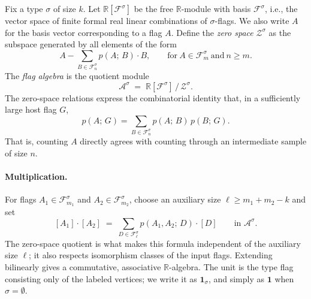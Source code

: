 \documentclass{article}
\newcommand{\den}[2]{p(#1;\,#2)}
\begin{document}
Fix a type $\sigma$ of size $k$.  Let
$\mathbb{R}[\mathcal{F}^\sigma]$ be the free $\mathbb{R}$-module with basis
$\mathcal{F}^\sigma$, i.e., the vector space of finite formal real linear
combinations of $\sigma$-flags.  We also write $A$ for the basis vector
corresponding to a flag $A$.
Define the \emph{zero space} $\mathcal{Z}^\sigma$ as the subspace generated
by all elements of the form
\[
  A - \sum_{B \in \mathcal{F}^\sigma_n} \den{A}{B} \cdot B,
  \qquad \text{for}\ A \in \mathcal{F}^\sigma_m \ \text{and}\ n \geq m.
\]
The \emph{flag algebra} is the quotient module
\[
  \mathcal{A}^\sigma \;=\; \mathbb{R}[\mathcal{F}^\sigma] \,/\, \mathcal{Z}^\sigma.
\]
The zero-space relations express the combinatorial identity that, in a
sufficiently large host flag $G$,
\[
  \den{A}{G}
  =
  \sum_{B \in \mathcal{F}^\sigma_n} \den{A}{B}\,\den{B}{G}.
\]
That is, counting $A$ directly agrees with counting through an intermediate
sample of size $n$.

\paragraph{Multiplication.}
For flags $A_1 \in \mathcal{F}^\sigma_{m_1}$ and
$A_2 \in \mathcal{F}^\sigma_{m_2}$, choose an auxiliary size
$\ell \geq m_1 + m_2 - k$ and set
\[
  [A_1] \cdot [A_2]
  \;=\;
  \sum_{D \in \mathcal{F}^\sigma_\ell} \den{A_1,A_2}{D} \cdot [D]
  \qquad\text{in } \mathcal{A}^\sigma.
\]
The zero-space quotient is what makes this formula independent of the
auxiliary size $\ell$; it also respects isomorphism classes of the input flags.
Extending bilinearly gives a commutative, associative $\mathbb{R}$-algebra.
The unit is the type flag consisting only of the labeled vertices; we write it
as $\mathbf{1}_\sigma$, and simply as $\mathbf{1}$ when $\sigma=\emptyset$.
\end{document}
